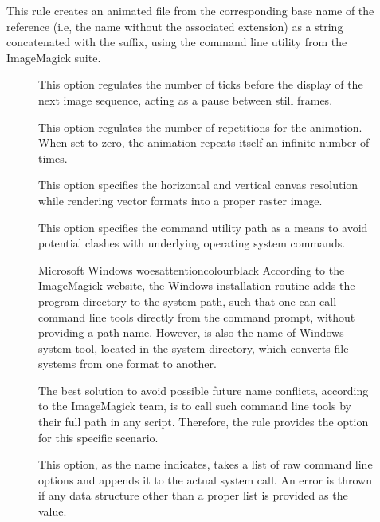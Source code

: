 \begin{description}
\item[]
This rule creates an animated  file from the corresponding base name of the  reference (i.e, the name without the associated extension) as a string concatenated with the  suffix, using the  command line utility from the ImageMagick suite.

\begin{description}
\item[] This option regulates the number of ticks before the display of the next image sequence, acting as a pause between still frames.

\item[] This option regulates the number of repetitions for the animation. When set to zero, the animation repeats itself an infinite number of times.

\item[] This option specifies the horizontal and vertical canvas resolution while rendering vector formats into a proper raster image.

\item[] This option specifies the command utility path as a means to avoid potential clashes with underlying operating system commands.

\begin{messagebox}{Microsoft Windows woes}{attentioncolour}{\icattention}{black}
\setlength{\parskip}{1em}
According to the \href{http://www.imagemagick.org/Usage/windows/}{ImageMagick website}, the Windows installation routine adds the program directory to the system path, such that one can call command line tools directly from the command prompt, without providing a path name. However,  is also the name of Windows system tool, located in the system directory, which converts file systems from one format to another.

The best solution to avoid possible future name conflicts, according to the ImageMagick team, is to call such command line tools by their full path in any script. Therefore, the  rule provides the  option for this specific scenario.
\end{messagebox}

\item[] This option, as the name indicates, takes a list of raw command line options and appends it to the actual system call. An error is thrown if any data structure other than a proper list is provided as the value.
\end{description}


\end{description}
